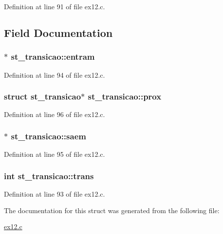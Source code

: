 Definition at line 91 of file ex12.\+c.



\subsection{Field Documentation}
\hypertarget{structst__transicao_ac6c32a5c66564a64d08f8236fbd8f0cb}{
\subsubsection[{entram}]{$\ast$ st\+\_\+transicao\+::entram}}\label{structst__transicao_ac6c32a5c66564a64d08f8236fbd8f0cb}


Definition at line 94 of file ex12.\+c.

\hypertarget{structst__transicao_a48dfc1e8eb0e9d01877112b340d7ba5c}{
\subsubsection[{prox}]{\setlength{\rightskip}{0pt plus 5cm}struct {\bf st\+\_\+transicao}$\ast$ st\+\_\+transicao\+::prox}}\label{structst__transicao_a48dfc1e8eb0e9d01877112b340d7ba5c}


Definition at line 96 of file ex12.\+c.

\hypertarget{structst__transicao_ad8423428e8e7544bbed187f4a78b11ab}{
\subsubsection[{saem}]{$\ast$ st\+\_\+transicao\+::saem}}\label{structst__transicao_ad8423428e8e7544bbed187f4a78b11ab}


Definition at line 95 of file ex12.\+c.

\hypertarget{structst__transicao_a22bd0f442dc1aaab89357adf10199cc2}{
\subsubsection[{trans}]{\setlength{\rightskip}{0pt plus 5cm}int st\+\_\+transicao\+::trans}}\label{structst__transicao_a22bd0f442dc1aaab89357adf10199cc2}


Definition at line 93 of file ex12.\+c.



The documentation for this struct was generated from the following file\+:\begin{DoxyCompactItemize}
\item 
\hyperlink{ex12_8c}{ex12.\+c}\end{DoxyCompactItemize}
